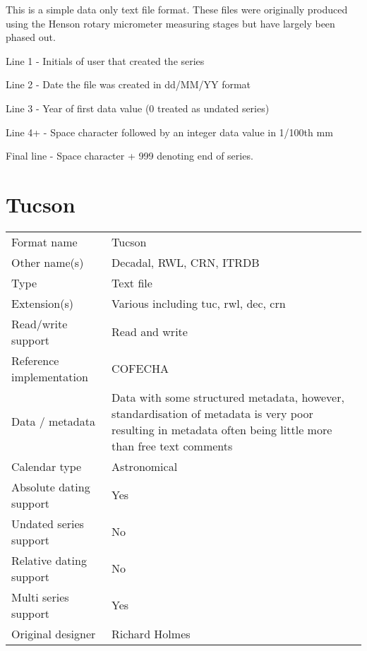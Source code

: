 This is a simple data only text file format. These files were originally produced using the Henson rotary micrometer measuring stages but have largely been phased out. 

\begin{itemize*}
 \item Line 1 - Initials of user that created the series
 \item Line 2 - Date the file was created in dd/MM/YY format
 \item Line 3 - Year of first data value (0 treated as undated series)
 \item Line 4+ - Space character followed by an integer data value in 1/100th mm
 \item Final line - Space character + 999 denoting end of series. 
\end{itemize*}


\chapter{Tucson}

\begin{table*}[htbp]
\label{summary:tucson}
\begin{center}
\begin{tabular*}{15cm}{ l @{\extracolsep{\fill}} p{9cm} }
  \toprule

Format name     	 & Tucson\\
Other name(s)      	 & Decadal, RWL, CRN, ITRDB\\
Type      	 	 & Text file\\
Extension(s)      	 & Various including tuc, rwl, dec, crn\\
Read/write support     	 & Read and write\\
Reference implementation & COFECHA\\
Data / metadata      	 & Data with some structured metadata, however, standardisation of metadata is very poor resulting in metadata often being little more than free text comments\\
Calendar type		 & Astronomical\\
Absolute dating support	 & Yes\\
Undated series support   & No\\
Relative dating support  & No\\
Multi series support	 & Yes\\
Original designer	 & Richard Holmes\\

\bottomrule
\end{tabular*}
\end{center}
\end{table*}

